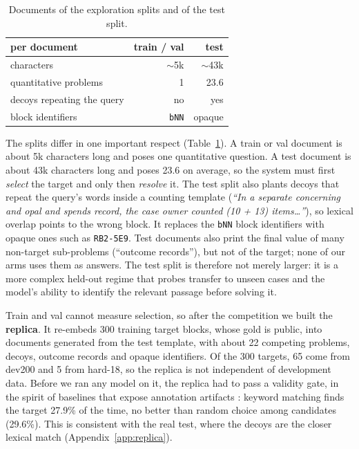 \documentclass[11pt]{article}%
\begin{document}
\begin{table}[t]
\centering
\small
\setlength{\tabcolsep}{4pt}
\begin{tabular}{lrr}
\toprule
per document & train / val & test \\
\midrule
characters                     & $\sim$5k & $\sim$43k \\
quantitative problems          & 1 & 23.6 \\
decoys repeating the query     & no & yes \\
block identifiers              & \texttt{bNN} & opaque \\
\bottomrule
\end{tabular}
\caption{Documents of the exploration splits and of the test split.}
\label{tab:shift}
\end{table}

The splits differ in one important respect (Table~\ref{tab:shift}). A train or val document is about
5k characters long and poses one quantitative question. A test document is
about 43k characters long and poses 23.6 on average, so the system must first
\emph{select} the target and only then \emph{resolve} it. The test split also
plants decoys that repeat the query's words inside a counting template
(\emph{``In a separate concerning and opal and spends record, the case owner
counted (10 + 13) items\ldots''}), so lexical overlap points to the wrong
block. It replaces the \texttt{bNN} block identifiers with opaque ones such as
\texttt{RB2-5E9}. Test documents also print the final value of many
non-target sub-problems (``outcome records''), but not of the target; none of
our arms uses them as answers. The test split is therefore not merely larger:
it is a more complex held-out regime that probes transfer to unseen cases and
the model's ability to identify the relevant passage before solving it.

Train and val cannot measure selection, so after the competition we built the
\textbf{replica}. It re-embeds 300 training target blocks, whose gold is
public, into documents generated from the test template, with about 22
competing problems, decoys, outcome records and opaque identifiers. Of the 300
targets, 65 come from dev200 and 5 from hard-18, so the replica is not
independent of development data. Before we ran any model on it, the replica
had to pass a validity gate, in the spirit of baselines that expose annotation artifacts \citep{gururangan2018annotation}: keyword matching finds the target 27.9\% of the
time, no better than random choice among candidates (29.6\%). This is consistent with
the real test, where the decoys are the closer lexical match
(Appendix~\ref{app:replica}).
\end{document}
